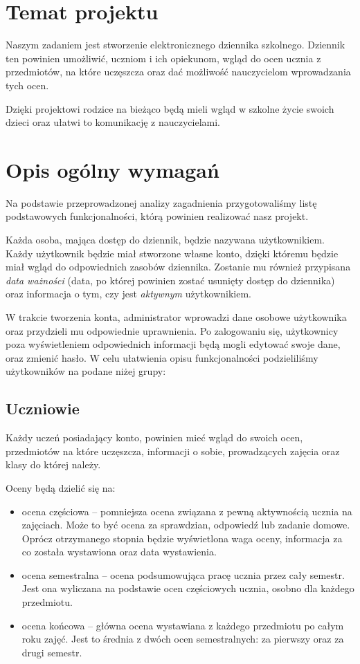 \documentclass[12pt, titlepage]{article}
\begin{document}
\tableofcontents

\newpage

\section{Temat projektu}
Naszym zadaniem jest stworzenie elektronicznego dziennika szkolnego. Dziennik ten powinien umożliwić, uczniom i ich opiekunom, wgląd do ocen ucznia z przedmiotów, na które uczęszcza oraz dać możliwość nauczycielom wprowadzania tych ocen. 

Dzięki projektowi rodzice na bieżąco będą mieli wgląd w szkolne życie swoich dzieci oraz ułatwi to komunikację z nauczycielami.   

\section{Opis ogólny wymagań}

Na podstawie przeprowadzonej analizy zagadnienia przygotowaliśmy listę podstawowych funkcjonalności, którą powinien realizować nasz projekt.

Każda osoba, mająca dostęp do dziennik, będzie nazywana użytkownikiem. Każdy użytkownik będzie miał stworzone własne konto, dzięki któremu będzie miał wgląd do odpowiednich zasobów dziennika. Zostanie mu również przypisana \textit{data ważności} (data, po której powinien zostać usunięty dostęp do dziennika) oraz informacja o tym, czy jest \textit{aktywnym} użytkownikiem.

W trakcie tworzenia konta, administrator wprowadzi dane osobowe użytkownika oraz przydzieli mu odpowiednie uprawnienia. Po zalogowaniu się, użytkownicy poza wyświetleniem odpowiednich informacji będą mogli edytować swoje dane, oraz zmienić hasło. W celu ułatwienia opisu funkcjonalności podzieliliśmy użytkowników na podane niżej grupy:

\subsection{Uczniowie}

Każdy uczeń posiadający konto, powinien mieć wgląd do swoich ocen, przedmiotów na które uczęszcza, informacji o sobie, prowadzących zajęcia oraz klasy do której należy.

Oceny będą dzielić się na:
\begin{itemize}
\item ocena częściowa -- pomniejsza ocena związana z pewną aktywnością ucznia na zajęciach. Może to być ocena za sprawdzian, odpowiedź lub zadanie domowe. Oprócz otrzymanego stopnia będzie wyświetlona waga oceny, informacja za co została wystawiona oraz data wystawienia.
\item ocena semestralna -- ocena podsumowująca pracę ucznia przez cały semestr. Jest ona wyliczana na podstawie ocen częściowych ucznia, osobno dla każdego przedmiotu.
\item ocena końcowa -- główna ocena wystawiana z każdego przedmiotu po całym roku zajęć. Jest to średnia z dwóch ocen semestralnych: za pierwszy oraz za drugi semestr.
\end{itemize}
\end{document}
